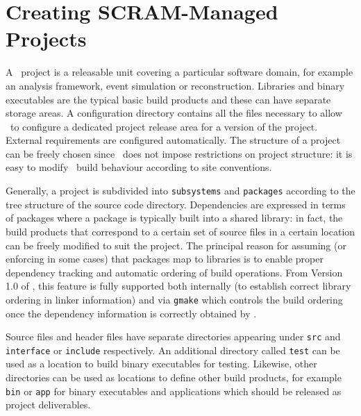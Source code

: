 \chapter{Creating SCRAM-Managed Projects}\label{ch:creatingprojects}

A \scram\ project is a releasable unit covering a particular software
domain, for example an analysis framework, event simulation or reconstruction.
Libraries and binary executables are the typical basic build products and these
can have separate storage areas. A configuration directory contains all the
files necessary to allow \scram\ to configure a dedicated project
release area for a version of the project. External requirements are
configured automatically. 
The structure of a project can be freely chosen since \scram\ does not
impose restrictions on project structure: it is
easy to modify \scram\ build behaviour according to site conventions.

\ni Generally, a project is subdivided into \texttt{subsystems} and
\texttt{packages} according to the tree structure of the source code
directory. Dependencies are expressed in terms of packages
where a package is typically built into a shared library: in fact,
the build products that correspond to a certain set of source files in
a certain location can be freely modified to suit the project. 
The principal reason for assuming (or enforcing in some cases) that
packages map to libraries is to enable proper dependency tracking and
automatic ordering of build operations. From Version 1.0 of \scram, 
this feature is fully supported both internally (to establish correct library
ordering in linker information) and via \texttt{gmake} which controls
the build ordering once the dependency information is correctly
obtained by \scram.

\ni Source files and header files have separate directories appearing under
\texttt{src} and \texttt{interface} or \texttt{include} respectively.
An additional directory called \texttt{test} can be used as a location 
to build binary executables for testing. Likewise, other directories 
can be used as locations to define other build products, for example 
\texttt{bin} or \texttt{app} for binary executables and applications 
which should be released as project deliverables.

